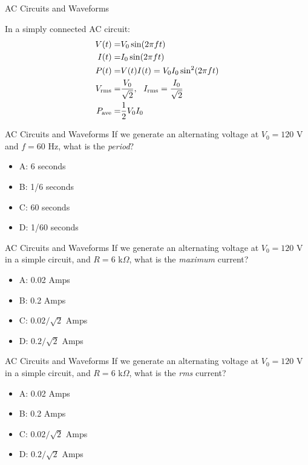 \documentclass{beamer}
\begin{document}
\begin{frame}{AC Circuits and Waveforms}
\begin{tcolorbox}[colback=white,colframe=gray,title=AC signals at a single frequency $f$]
\alert{In a simply connected AC circuit:
\begin{align}
V(t) =& V_0 \sin(2\pi f t) \\
I(t) =& I_0 \sin(2\pi f t) \\
P(t) =& V(t) I(t) = V_0 I_0 \sin^2(2\pi f t) \\
V_{\rm rms} =& \frac{V_0}{\sqrt{2}}, ~~ I_{\rm rms} = \frac{I_0}{\sqrt{2}} \\
P_{\rm ave} =& \frac{1}{2} V_0 I_0
\end{align}}
\end{tcolorbox}
\end{frame}

\begin{frame}{AC Circuits and Waveforms}
If we generate an alternating voltage at $V_0 = 120$ V and $f = 60$ Hz, what is the \textit{period}?
\begin{itemize}
\item A: 6 seconds
\item B: 1/6 seconds
\item C: 60 seconds
\item D: 1/60 seconds
\end{itemize}
\end{frame}

\begin{frame}{AC Circuits and Waveforms}
If we generate an alternating voltage at $V_0 = 120$ V in a simple circuit, and $R = 6$ k$\Omega$, what is the \textit{maximum} current?
\begin{itemize}
\item A: 0.02 Amps
\item B: 0.2 Amps
\item C: $0.02/\sqrt{2}$ Amps
\item D: $0.2/\sqrt{2}$ Amps
\end{itemize}
\end{frame}

\begin{frame}{AC Circuits and Waveforms}
If we generate an alternating voltage at $V_0 = 120$ V in a simple circuit, and $R = 6$ k$\Omega$, what is the \textit{rms} current?
\begin{itemize}
\item A: 0.02 Amps
\item B: 0.2 Amps
\item C: $0.02/\sqrt{2}$ Amps
\item D: $0.2/\sqrt{2}$ Amps
\end{itemize}
\end{frame}
\end{document}
